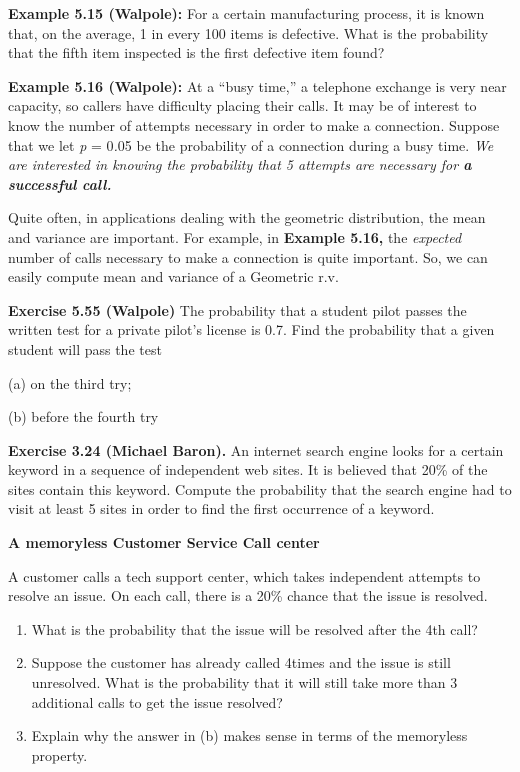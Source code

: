 \documentclass[
  11pt,
  letterpaper,
  DIV=11,
  numbers=noendperiod]{scrreprt}
\providecommand{\tightlist}{%
  \setlength{\itemsep}{0pt}\setlength{\parskip}{0pt}}
\begin{document}
\textbf{Example 5.15 (Walpole):} For a certain manufacturing process, it
is known that, on the average, 1 in every 100 items is defective. What
is the probability that the fifth item inspected is the first defective
item found?

\textbf{Example 5.16 (Walpole):} At a ``busy time,'' a telephone
exchange is very near capacity, so callers have difficulty placing their
calls. It may be of interest to know the number of attempts necessary in
order to make a connection. Suppose that we let \emph{p} = 0\emph{.}05
be the probability of a connection during a busy time. \emph{We are
interested in knowing the probability that 5 attempts are necessary for
\textbf{a successful call.}}

Quite often, in applications dealing with the geometric distribution,
the mean and variance are important. For example, in \textbf{Example
5.16,} the \emph{expected} number of calls necessary to make a
connection is quite important. So, we can easily compute mean and
variance of a Geometric r.v.

\textbf{Exercise 5.55 (Walpole)} The probability that a student pilot
passes the written test for a private pilot's license is 0.7. Find the
probability that a given student will pass the test

(a) on the third try;

(b) before the fourth try

\textbf{Exercise 3.24 (Michael Baron).} An internet search engine looks
for a certain keyword in a sequence of independent web sites. It is
believed that 20\% of the sites contain this keyword. Compute the
probability that the search engine had to visit at least 5 sites in
order to find the first occurrence of a keyword.

\textbf{A memoryless Customer Service Call center}

A customer calls a tech support center, which takes independent attempts
to resolve an issue. On each call, there is a 20\% chance that the issue
is resolved.

\begin{enumerate}
\def\labelenumi{(\alph{enumi})}
\tightlist
\item
  What is the probability that the issue will be resolved after the 4th
  call?
\item
  Suppose the customer has already called 4times and the issue is still
  unresolved. What is the probability that it will still take more than
  3 additional calls to get the issue resolved?
\item
  Explain why the answer in (b) makes sense in terms of the memoryless
  property.
\end{enumerate}
\end{document}
